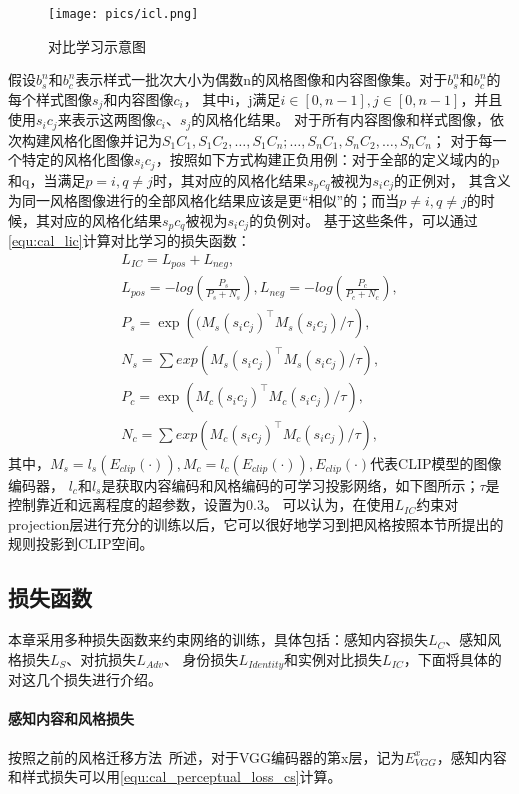 \begin{figure}[htbp]
    \centering
    \texttt{[image: pics/icl.png]}
    \caption{\label{fig:pic_icl}对比学习示意图}
\end{figure}
假设$b_s^n$和$b_c^n$表示样式一批次大小为偶数n的风格图像和内容图像集。对于$b_s^n$和$b_c^n$的每个样式图像$s_j$和内容图像$c_i$，
其中i，j满足\(i\in[0,n-1],j\in[0,n-1]\)，并且使用$s_ic_j$来表示这两图像$c_i$、$s_j$的风格化结果。
对于所有内容图像和样式图像，依次构建风格化图像并记为\(S_1C_1,S_1C_2,\ldots,S_1C_n;\ldots,S_nC_1,S_nC_2,\ldots,S_nC_n\)；
对于每一个特定的风格化图像$s_i c_j$，按照如下方式构建正负用例：对于全部的定义域内的p和q，当满足$p= i,q\neq j$时，其对应的风格化结果$s_p c_q$被视为$s_i c_j$的正例对，
其含义为同一风格图像进行的全部风格化结果应该是更“相似”的；而当$p\neq i,q\neq j$的时候，其对应的风格化结果$s_p c_q$被视为$s_i c_j$的负例对。
基于这些条件，可以通过\autoref{equ:cal_lic}计算对比学习的损失函数：
\begin{equation}
    \label{equ:cal_lic}
    \begin{gathered}
        L_{IC}=L_{pos}+L_{neg}, \\
        L_{pos} =-log(\frac{P_s}{P_s+N_s}),L_{neg}=-log(\frac{P_c}{P_c+N_c}), \\
        P_s=\exp\left((M_s(s_ic_j)^\top M_s(s_ic_j)/\tau\right), \\
        N_s=\sum exp(M_s(s_ic_j)^\top M_s(s_ic_j)/\tau), \\
        P_c=\exp{(M_c(s_ic_j)^\top M_c(s_ic_j)/\tau)}, \\
        N_c=\sum exp(M_c(s_ic_j)^\top M_c(s_ic_j)/\tau), 
        \end{gathered}
\end{equation}
其中，\(M_s=l_s(E_{clip}(\cdot)),M_c=l_c(E_{clip}(\cdot)),E_{clip}(\cdot)\)代表CLIP模型的图像编码器，
$l_c$和$l_s$是获取内容编码和风格编码的可学习投影网络，如下图所示；$\tau$是控制靠近和远离程度的超参数，设置为0.3。
可以认为，在使用$L_{IC}$约束对projection层进行充分的训练以后，它可以很好地学习到把风格按照本节所提出的规则投影到CLIP空间。

\subsection{损失函数}
本章采用多种损失函数来约束网络的训练，具体包括：感知内容损失$L_C$、感知风格损失$L_S$、对抗损失$L_{Adv}$、
身份损失$L_{Identity}$和实例对比损失$L_{IC}$，下面将具体的对这几个损失进行介绍。
\paragraph{感知内容和风格损失}
\par 按照之前的风格迁移方法~\cite{han2021dual}所述，对于VGG编码器的第x层，记为$E_{VGG}^x$，感知内容和样式损失可以用\autoref{equ:cal_perceptual_loss_cs}计算。

